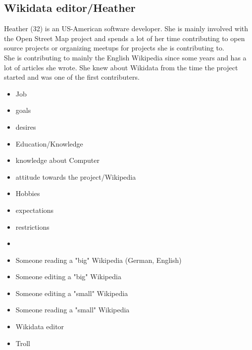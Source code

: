 \documentclass[11pt]{article}
\begin{document}
  \subsection{Wikidata editor/Heather}
  Heather (32) is an US-American software developer. She is mainly involved with the Open Street Map project and spends a lot of her time contributing to open source projects or organizing meetups for projects she is contributing to. \\
  She is contributing to mainly the English Wikipedia since some years and has a lot of articles she wrote. 
  She knew about Wikidata from the time the project started and was one of the first contributers. 

  \begin{itemize}
    \item Job
    \item goals
    \item desires
    \item Education/Knowledge
    \item knowledge about Computer
    \item attitude towards the project/Wikipedia
    \item Hobbies
    \item expectations
    \item restrictions

    \item
    \item Someone reading a "big" Wikipedia (German, English)
    \item Someone editing a "big" Wikipedia
    \item Someone editing a "small" Wikipedia
    \item Someone reading a "small" Wikipedia 
    \item Wikidata editor
    \item Troll
  \end{itemize}
\end{document}
